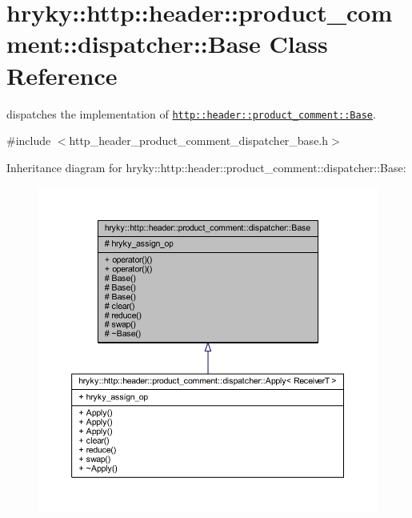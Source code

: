 \hypertarget{classhryky_1_1http_1_1header_1_1product__comment_1_1dispatcher_1_1_base}{\section{hryky\-:\-:http\-:\-:header\-:\-:product\-\_\-comment\-:\-:dispatcher\-:\-:Base Class Reference}
\label{classhryky_1_1http_1_1header_1_1product__comment_1_1dispatcher_1_1_base}
}


dispatches the implementation of \href{http::header::product_comment::Base}{\tt http\-::header\-::product\-\_\-comment\-::\-Base}.  




{\ttfamily \#include $<$http\-\_\-header\-\_\-product\-\_\-comment\-\_\-dispatcher\-\_\-base.\-h$>$}



Inheritance diagram for hryky\-:\-:http\-:\-:header\-:\-:product\-\_\-comment\-:\-:dispatcher\-:\-:Base\-:
\nopagebreak
\begin{figure}[H]
\begin{center}
\leavevmode
\includegraphics[width=350pt]{classhryky_1_1http_1_1header_1_1product__comment_1_1dispatcher_1_1_base__inherit__graph}
\end{center}
\end{figure}
